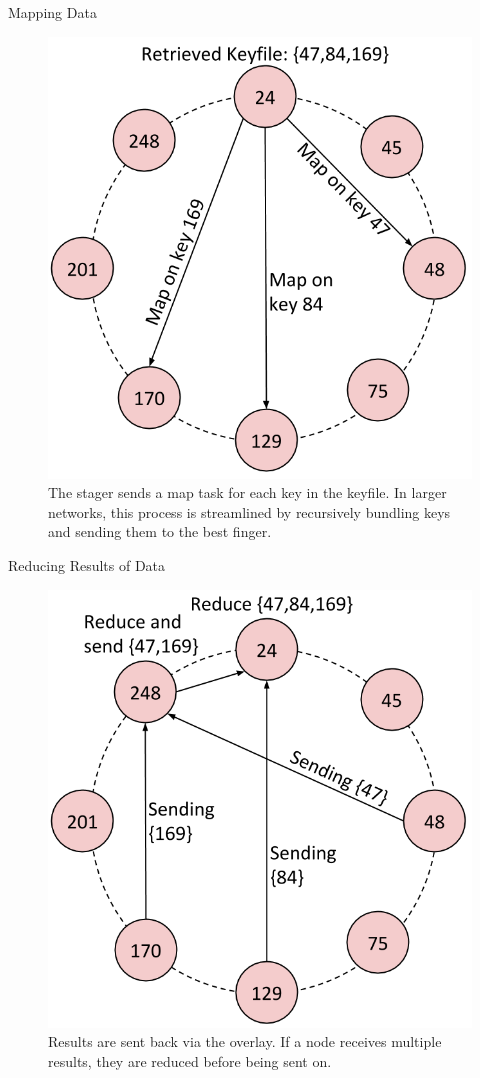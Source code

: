 \documentclass[11pt]{beamer}
\begin{document}
\begin{frame}{Mapping Data}
	\begin{figure}
	    \includegraphics[width=0.48\linewidth]{figs/CR_dataflow2}
	    \caption{ \footnotesize{The stager sends a map task for each key in the keyfile. In larger networks, this process is streamlined by recursively bundling keys and sending them to the best finger.}}
		
	\end{figure}
\end{frame}




\begin{frame}{Reducing Results of Data}
	\begin{figure}
	    \includegraphics[width=0.50\linewidth]{figs/CR_dataflow3}
	    \caption{Results are sent back via the overlay. If a node receives multiple results, they are reduced before being sent on.}
	\end{figure}
\end{frame}

\end{document}
